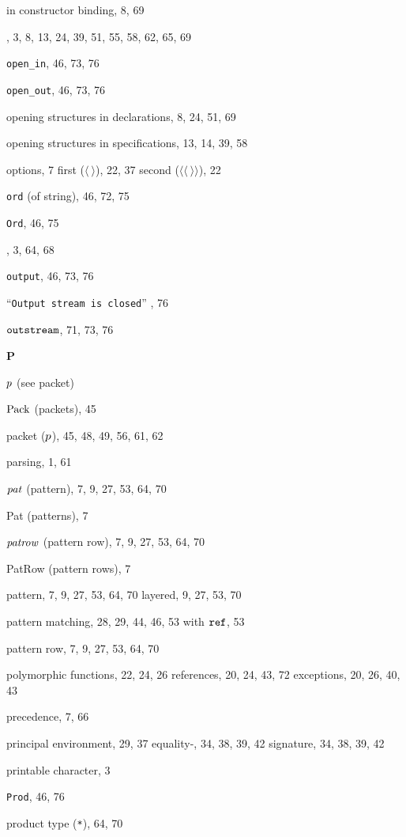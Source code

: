 \begin{theindex}
\subitem in constructor binding, 8, 69
\item \OPEN, 3, 8, 13, 24, 39, 51, 55, 58, 62, 65, 69
\item \verb+open_in+, 46, 73, 76
\item \verb+open_out+, 46, 73, 76
\item opening structures in declarations, 8, 24, 51, 69
\item opening structures in specifications, 13, 14, 39, 58
\item options, 7
\subitem first ($\langle\ \rangle$), 22, 37
\subitem second ($\langle\langle\ \rangle\rangle$), 22
\item {\tt ord} (of string), 46, 72, 75
\item {\tt Ord}, 46, 75
\item \ORELSE, 3, 64, 68
\item {\tt output}, 46, 73, 76
\item ``{\tt Output stream is closed}'' , 76
\item $\mbox{\tt outstream}$, 71, 73, 76
\indexspace
\parbox{65mm}{\hfil{\large\bf P}\hfil}
\indexspace
\item $p$ (see packet) 
\item ${\rm Pack}$ (packets), 45
\item packet ($p$), 45, 48, 49, 56, 61, 62
\item parsing, 1, 61
\item ${\it pat}$ (pattern), 7, 9, 27, 53, 64, 70
\item Pat (patterns), 7
\item ${\it patrow}$ (pattern row), 7, 9, 27, 53, 64, 70
\item PatRow (pattern rows), 7
\item pattern, 7, 9, 27, 53, 64, 70
\subitem layered, 9, 27, 53, 70
\item pattern matching, 28, 29, 44, 46, 53
\subitem with $\mbox{\tt ref}$, 53
\item pattern row, 7, 9, 27, 53, 64, 70
\item polymorphic 
\subitem functions, 22, 24, 26
\subitem references, 20, 24, 43, 72
\subitem exceptions, 20, 26, 40, 43
\item precedence, 7, 66
\item principal 
\subitem environment, 29, 37
\subitem equality-, 34, 38, 39, 42
\subitem signature, 34, 38, 39, 42
\item printable character, 3
\item {\tt Prod}, 46, 76
\item product type (\verb+*+), 64, 70

\end{theindex}
